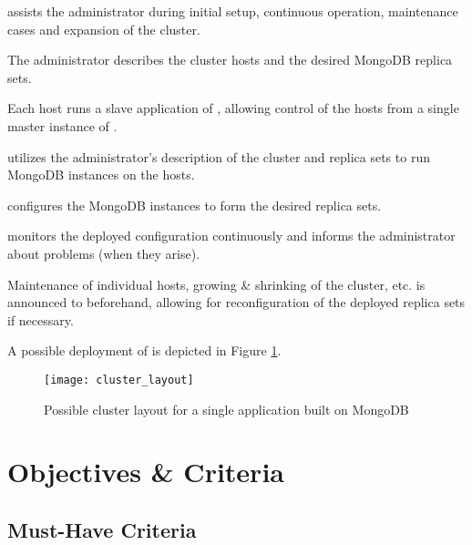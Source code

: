 \documentclass[a4paper, 11pt]{article}
\begin{document}
\mamid assists the \gls{administrator} during initial setup, continuous operation, maintenance cases and expansion of the cluster.

The \gls{administrator} describes the \gls{cluster} \glspl{host} and the desired \gls{MongoDB} \glspl{replica set}.

Each \gls{host} runs a \gls{slave} application of \mamid, allowing control of the \glspl{host} from a single \gls{master} instance of \mamid.

\mamid utilizes the \gls{administrator}'s description of the cluster and replica sets to run \gls{MongoDB} instances on the \glspl{host}.

\mamid configures the \gls{MongoDB} instances to form the desired replica sets.

\mamid monitors the deployed configuration continuously and informs the \gls{administrator} about problems (when they arise).

Maintenance of individual \glspl{host}, growing \& shrinking of the cluster, etc. is announced to \mamid beforehand, allowing for reconfiguration of the deployed \glspl{replica set} if necessary.

A possible deployment of \mamid is depicted in Figure \ref{fig:cluster_layout}.

\begin{figure}[H]
	\centering
	\texttt{[image: cluster\_layout]}
	\caption{Possible cluster layout for a single application built on MongoDB}
	\label{fig:cluster_layout}
\end{figure}

\section{Objectives \& Criteria}
\subsection{Must-Have Criteria}
\end{document}
